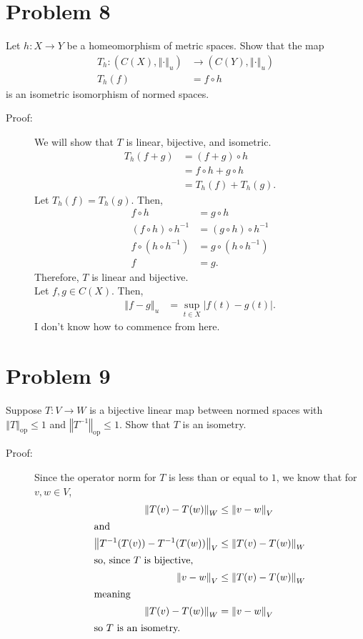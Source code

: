 \documentclass[8pt]{extarticle}
\newcommand{\norm}[1]{\left\Vert #1\right\Vert}
\begin{document}
  \section{Problem 8}%
  Let $h: X\rightarrow Y$ be a homeomorphism of metric spaces. Show that the map
  \begin{align*}
    T_h: (C(X),\norm{\cdot}_u) &\rightarrow (C(Y),\norm{\cdot}_u)\\
    T_h(f) &= f\circ h
  \end{align*}
  is an isometric isomorphism of normed spaces.
  \begin{description}
    \item[Proof:] We will show that $T$ is linear, bijective, and isometric. 
      \begin{align*}
        T_{h}(f + g) &= (f+g)\circ h\\
                     &= f\circ h + g\circ h \\
                     &= T_h(f) + T_h(g).
      \end{align*}
      Let $T_h(f) = T_h(g)$. Then,
      \begin{align*}
        f\circ h &= g\circ h\\
        (f\circ h)\circ h^{-1} &= (g\circ h)\circ h^{-1}\\
        f\circ (h\circ h^{-1}) &= g\circ (h\circ h^{-1})\\
        f &= g.
      \end{align*}
      Therefore, $T$ is linear and bijective.\\

      Let $f,g\in C(X)$. Then,
      \begin{align*}
        \norm{f-g}_{u} &= \sup_{t\in X}|f(t)-g(t)|.
      \end{align*}
      I don't know how to commence from here.
  \end{description}
  
  \section{Problem 9}%
  Suppose $T: V\rightarrow W$ is a bijective linear map between normed spaces with $\norm{T}_{\text{op}} \leq 1$ and $\norm{T^{-1}}_{\text{op}}\leq 1$. Show that $T$ is an isometry.
  \begin{description}
    \item[Proof:] Since the operator norm for $T$ is less than or equal to $1$, we know that for $v,w\in V$,
      \begin{align*}
        \norm{T(v)-T(w)}_{W} &\leq \norm{v-w}_{V}\\
        \intertext{and}
        \norm{T^{-1}(T(v)) - T^{-1}(T(w))}_{V} &\leq \norm{T(v)-T(w)}_{W}\\
        \intertext{so, since $T$ is bijective,}
        \norm{v-w}_{V} &\leq \norm{T(v)-T(w)}_{W}\\
        \intertext{meaning}
        \norm{T(v)-T(w)}_{W} &= \norm{v-w}_{V}\\
        \intertext{so $T$ is an isometry.}
      \end{align*}
  \end{description}
\end{document}
